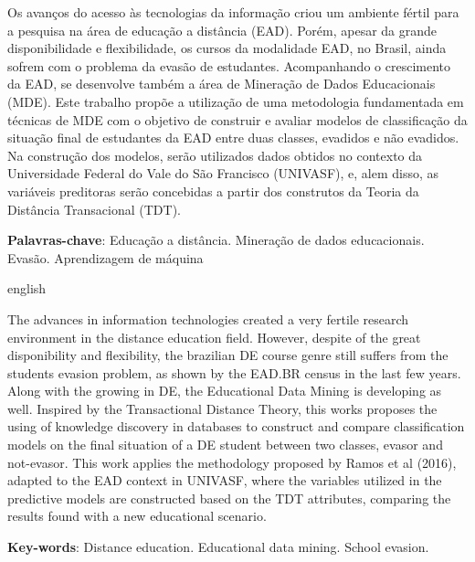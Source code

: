 \setlength{\absparsep}{18pt} %
\begin{resumo}

  Os avanços do acesso às tecnologias da informação criou um ambiente fértil
  para a pesquisa na área de educação a distância (EAD). Porém, apesar da grande
  disponibilidade e flexibilidade, os cursos da modalidade EAD, no Brasil, ainda
  sofrem com o problema da evasão de estudantes. Acompanhando o crescimento da
  EAD, se desenvolve também a área de Mineração de Dados Educacionais (MDE).
  Este trabalho propõe a utilização de uma metodologia fundamentada em técnicas
  de MDE com o objetivo de construir e avaliar modelos de classificação da
  situação final de estudantes da EAD entre duas classes, evadidos e não
  evadidos. Na construção dos modelos, serão utilizados dados obtidos no
  contexto da Universidade Federal do Vale do São Francisco (UNIVASF), e, alem
  disso, as variáveis preditoras serão concebidas a partir dos construtos da
  Teoria da Distância Transacional (TDT).

  \textbf{Palavras-chave}: Educação a distância. Mineração de dados
  educacionais. Evasão. Aprendizagem de máquina

\end{resumo}
\newpage

\begin{resumo}[Abstract]
\begin{otherlanguage*}{english}

  The advances in information technologies created a very fertile research
  environment in the distance education field. However, despite of the great
  disponibility and flexibility, the   brazilian DE course genre still suffers
  from the students evasion problem, as shown by the EAD.BR census in the last
  few years. Along with the growing in DE, the Educational Data Mining is
  developing as well. Inspired by the Transactional Distance Theory, this works
  proposes the using of knowledge discovery in databases to construct and
  compare classification models on the final situation of a DE student between
  two classes, evasor and not-evasor. This work applies the methodology proposed
  by Ramos et al (2016), adapted to the EAD context in UNIVASF, where the variables utilized in the predictive models
  are constructed based on the TDT attributes, comparing the results found with
  a new educational scenario.

  \textbf{Key-words}: Distance education. Educational data mining. School
  evasion.

\end{otherlanguage*}
\end{resumo}


